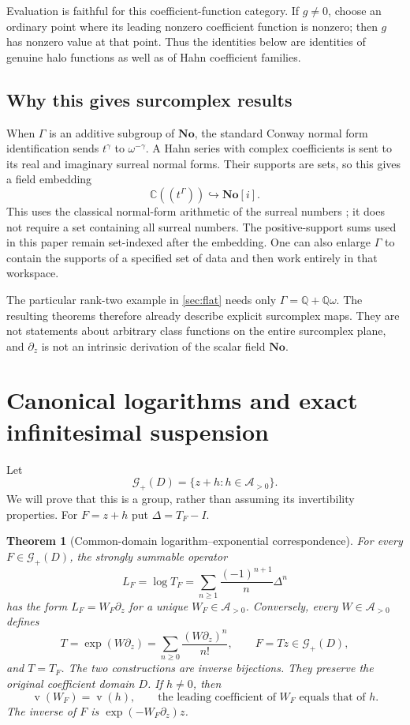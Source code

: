\documentclass[11pt,a4paper]{article}
\numberwithin{equation}{section}
\newtheorem{theorem}{Theorem}[section]
\theoremstyle{definition}
\theoremstyle{remark}
\newcommand{\C}{\mathbb C}
\newcommand{\Q}{\mathbb Q}
\newcommand{\No}{\mathbf{No}}
\newcommand{\A}{\mathcal A}
\newcommand{\G}{\mathcal G}
\newcommand{\val}{\operatorname{v}}
\begin{document}
Evaluation is faithful for this coefficient-function category.  If
$g\ne0$, choose an ordinary point where its leading nonzero coefficient
function is nonzero; then $g$ has nonzero value at that point.  Thus the
identities below are identities of genuine halo functions as well as of
Hahn coefficient families.

\subsection{Why this gives surcomplex results}

When $\Gamma$ is an additive subgroup of $\No$, the standard Conway normal
form identification sends $t^\gamma$ to $\omega^{-\gamma}$.  A Hahn
series with complex coefficients is sent to its real and imaginary surreal
normal forms.  Their supports are sets, so this gives a field embedding
\[
 \C((t^\Gamma))\hookrightarrow\No[i].
\]
This uses the classical normal-form arithmetic of the surreal numbers
\cite{gonshor}; it does not require a set containing all surreal numbers.
The positive-support sums used in this paper remain set-indexed after the
embedding.  One can also enlarge $\Gamma$ to contain the supports of a
specified set of data and then work entirely in that workspace.

The particular rank-two example in \cref{sec:flat} needs only
$\Gamma=\Q+\Q\omega$.  The resulting theorems therefore already describe
explicit surcomplex maps.  They are not statements about arbitrary class
functions on the entire surcomplex plane, and $\partial_z$ is not an
intrinsic derivation of the scalar field $\No$.

\section{Canonical logarithms and exact infinitesimal suspension}
\label{sec:logarithm}

Let
\[
 \G_+(D)=\{z+h:h\in\A_{>0}\}.
\]
We will prove that this is a group, rather than assuming its invertibility
properties.  For $F=z+h$ put $\Delta=T_F-I$.

\begin{theorem}[Common-domain logarithm--exponential correspondence]
\label{thm:logexp}
For every $F\in\G_+(D)$, the strongly summable operator
\begin{equation}\label{eq:operatorlog}
 L_F=\log T_F=\sum_{n\geq1}\frac{(-1)^{n+1}}{n}\Delta^n
\end{equation}
has the form $L_F=W_F\partial_z$ for a unique $W_F\in\A_{>0}$.
Conversely, every $W\in\A_{>0}$ defines
\begin{equation}\label{eq:operatorexp}
 T=\exp(W\partial_z)=\sum_{n\geq0}\frac{(W\partial_z)^n}{n!},
 \qquad F=Tz\in\G_+(D),
\end{equation}
and $T=T_F$.  The two constructions are inverse bijections.  They preserve
the original coefficient domain $D$.  If $h\ne0$, then
\[
 \val(W_F)=\val(h),\qquad
 \text{the leading coefficient of }W_F\text{ equals that of }h.
\]
The inverse of $F$ is $\exp(-W_F\partial_z)z$.
\end{theorem}
\end{document}
